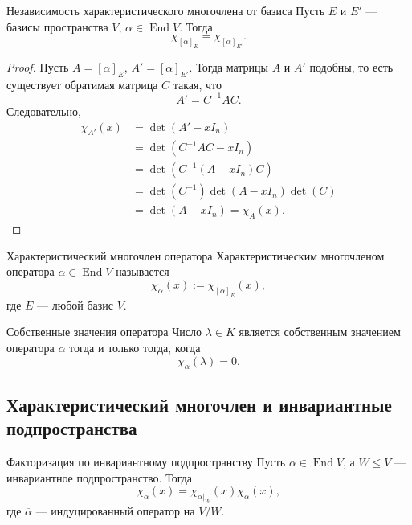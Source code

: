 \begin{Theorem}{Независимость характеристического многочлена от базиса}{}
	Пусть $E$ и $E'$ --- базисы пространства $V$, $\alpha\in\operatorname{End} V$.
	Тогда
	\[
	\chi_{[\alpha]_E}=\chi_{[\alpha]_{E'}}.
	\]
\end{Theorem}

\begin{proof}
	Пусть $A=[\alpha]_E$, $A'=[\alpha]_{E'}$.
	Тогда матрицы $A$ и $A'$ подобны, то есть существует обратимая матрица $C$ такая, что
	\[
	A'=C^{-1}AC.
	\]
	Следовательно,
	\begin{align*}
		\chi_{A'}(x)
		&=\det(A'-xI_n)\\
		&=\det(C^{-1}AC-xI_n)\\
		&=\det(C^{-1}(A-xI_n)C)\\
		&=\det(C^{-1})\det(A-xI_n)\det(C)\\
		&=\det(A-xI_n)
		=
		\chi_A(x).
	\end{align*}
\end{proof}

\begin{Definition}{Характеристический многочлен оператора}{}
	Характеристическим многочленом оператора $\alpha\in\operatorname{End} V$ называется
	\[
	\chi_\alpha(x):=\chi_{[\alpha]_E}(x),
	\]
	где $E$ --- любой базис $V$.
\end{Definition}

\begin{Corollary}{Собственные значения оператора}{}
	Число $\lambda\in K$ является собственным значением оператора $\alpha$ тогда и только тогда, когда
	\[
	\chi_\alpha(\lambda)=0.
	\]
\end{Corollary}

\subsection{Характеристический многочлен и инвариантные подпространства}

\begin{Theorem}{Факторизация по инвариантному подпространству}{}
	Пусть $\alpha\in\operatorname{End} V$, а $W\le V$ --- инвариантное подпространство.
	Тогда
	\[
	\chi_\alpha(x)
	=
	\chi_{\alpha|_W}(x)\chi_{\overline{\alpha}}(x),
	\]
	где $\overline{\alpha}$ --- индуцированный оператор на $V/W$.
\end{Theorem}

